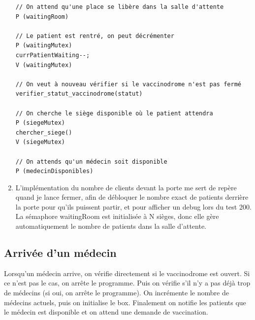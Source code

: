 \documentclass[a4paper]{article}
\begin{document}
\begin{enumerate}
\begin{verbatim}
// On attend qu'une place se libère dans la salle d'attente
P (waitingRoom)

// Le patient est rentré, on peut décrémenter
P (waitingMutex)
currPatientWaiting--;
V (waitingMutex)

// On veut à nouveau vérifier si le vaccinodrome n'est pas fermé
verifier_statut_vaccinodrome(statut)

// On cherche le siège disponible où le patient attendra
P (siegeMutex)
chercher_siege()
V (siegeMutex)

// On attends qu'un médecin soit disponible
P (medecinDisponibles)

    \end{verbatim}

    \item L'implémentation du nombre de clients devant la porte me sert de repère quand je lance fermer,
    afin de débloquer le nombre exact de patients derrière la porte pour qu'ils puissent partir, et pour afficher un debug lors du test 200. La sémaphore waitingRoom est initialisée à N sièges, donc elle gère automatiquement le nombre de patients dans la salle d'attente.
  \end{enumerate}
  \newpage
  \subsection{Arrivée d'un médecin}

  Lorsqu'un médecin arrive, on vérifie directement si le vaccinodrome est ouvert. Si ce n'est pas le cas, on arrête le programme. Puis on vérifie s'il n'y a pas déjà trop de médecins (si oui, on arrête le programme). On incrémente le nombre de médecins actuels, puis on initialise le box.
  Finalement on notifie les patients que le médecin est disponible et on attend une demande de vaccination.
\end{document}
